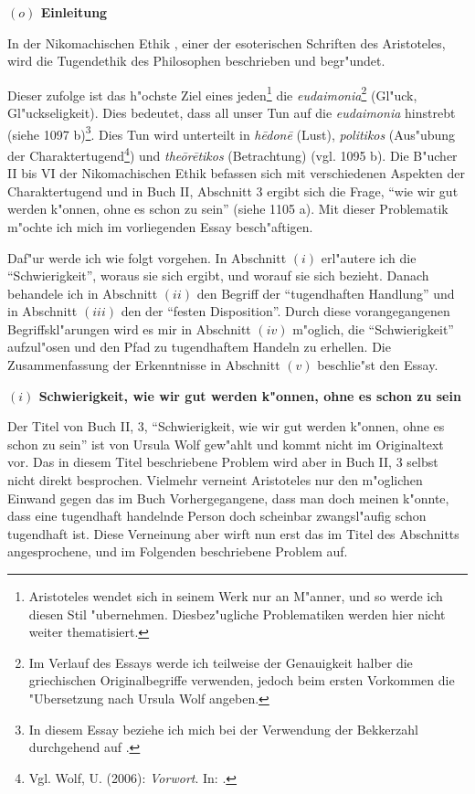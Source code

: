\documentclass[a4paper, emulatestandardclasses, 12pt]{scrartcl}
\begin{document}
\begin{onehalfspace} 



\noindent\textbf{$(o)$ Einleitung}

\noindent In der Nikomachischen Ethik \citep{wolf2006nikomachische}, einer der esoterischen Schriften des Aristoteles, wird die Tugendethik des Philosophen beschrieben und begr"undet.

Dieser zufolge ist das h"ochste Ziel eines jeden\footnote{Aristoteles wendet sich in seinem Werk nur an M"anner, und so werde ich diesen Stil "ubernehmen. Diesbez"ugliche Problematiken werden hier nicht weiter thematisiert.} die \emph{eudaimonia}\footnote{Im Verlauf des Essays werde ich teilweise der Genauigkeit halber die griechischen Originalbegriffe verwenden, jedoch beim ersten Vorkommen die "Ubersetzung nach Ursula Wolf angeben.} (Gl"uck, Gl"uckseligkeit). Dies bedeutet, dass all unser Tun auf die \emph{eudaimonia} hinstrebt (siehe 1097 b)\footnote{In diesem Essay beziehe ich mich bei der Verwendung der Bekkerzahl durchgehend auf \citep{wolf2006nikomachische}.}. Dies Tun wird unterteilt in \emph{h\={e}don\={e}} (Lust), \emph{politikos} (Aus"ubung der Charaktertugend\footnote{Vgl. Wolf, U. (2006): \emph{Vorwort}. In: \citep{wolf2006nikomachische}.}) und \emph{the\={o}r\={e}tikos} (Betrachtung) (vgl. 1095 b). Die B"ucher II bis VI der Nikomachischen Ethik befassen sich mit verschiedenen Aspekten der Charaktertugend und in Buch II, Abschnitt 3 ergibt sich die Frage, "`wie wir gut werden k"onnen, ohne es schon zu sein"' (siehe 1105 a). Mit dieser Problematik m"ochte ich mich im vorliegenden Essay besch"aftigen.\newline

Daf"ur werde ich wie folgt vorgehen. In Abschnitt $(i)$ erl"autere ich die "`Schwierigkeit"', woraus sie sich ergibt, und worauf sie sich bezieht. Danach behandele ich in Abschnitt $(ii)$ den Begriff der "`tugendhaften Handlung"' und in Abschnitt $(iii)$ den der "`festen Disposition"'. Durch diese vorangegangenen Begriffskl"arungen wird es mir in Abschnitt $(iv)$ m"oglich, die "`Schwierigkeit"' aufzul"osen und den Pfad zu tugendhaftem Handeln zu erhellen. Die Zusammenfassung der Erkenntnisse in Abschnitt $(v)$ beschlie"st den Essay.

\vspace{6mm}

\noindent\textbf{$(i)$ Schwierigkeit, wie wir gut werden k"onnen, ohne es schon zu sein}

\noindent Der Titel von Buch II, 3, "`Schwierigkeit, wie wir gut werden k"onnen, ohne es schon zu sein"' ist von Ursula Wolf gew"ahlt und kommt nicht im Originaltext vor. Das in diesem Titel beschriebene Problem wird aber in Buch II, 3 selbst nicht direkt besprochen. Vielmehr verneint Aristoteles nur den m"oglichen Einwand gegen das im Buch Vorhergegangene, dass man doch meinen k"onnte, dass eine tugendhaft handelnde Person doch scheinbar zwangsl"aufig schon tugendhaft ist. Diese Verneinung aber wirft nun erst das im Titel des Abschnitts angesprochene, und im Folgenden beschriebene Problem auf.


\end{onehalfspace}
\end{document}
